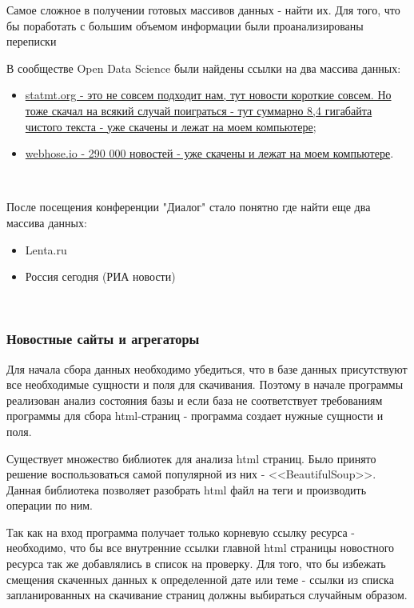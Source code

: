 Самое сложное в получении готовых массивов данных - найти их. Для того, что бы поработать с большим объемом информации были проанализированы переписки 

В сообществе Open Data Science были найдены ссылки на два массива данных:

\begin{itemize}
    \item \href{http://www.statmt.org/wmt15/translation-task.html}{statmt.org - это не совсем подходит нам, тут новости короткие совсем. Но тоже скачал на всякий случай поиграться - тут суммарно 8,4 гигабайта чистого текста - уже скачены и лежат на моем компьютере};
    \item \href{https://webhose.io/free-datasets/russian-news-articles/}{webhose.io - 290 000 новостей - уже скачены и лежат на моем компьютере}.
\end{itemize}
~\

После посещения конференции "Диалог" стало понятно где найти еще два массива данных: 

\begin{itemize}
    \item Lenta.ru
    \item Россия сегодня (РИА новости)
\end{itemize}
~\

\subsubsection{Новостные сайты и агрегаторы}

Для начала сбора данных необходимо убедиться, что в базе данных присутствуют все необходимые сущности и поля для скачивания. Поэтому в начале программы реализован анализ состояния базы и если база не соответствует требованиям программы для сбора html-страниц - программа создает нужные сущности и поля.

Существует множество библиотек для анализа html страниц. Было принято решение воспользоваться самой популярной из них - <<BeautifulSoup>>. Данная библиотека позволяет разобрать html файл на теги и производить операции по ним.

Так как на вход программа получает только корневую ссылку ресурса - необходимо, что бы все внутренние ссылки главной html страницы новостного ресурса так же добавлялись в список на проверку. Для того, что бы избежать смещения скаченных данных к определенной дате или теме - ссылки из списка запланированных на скачивание страниц должны выбираться случайным образом.

